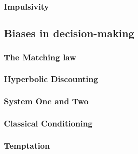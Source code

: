 \subsubsection{Impulsivity}



\subsection{Biases in decision-making}

\subsubsection{The Matching law}


\subsubsection{Hyperbolic Discounting}


\subsubsection{System One and Two}


\subsubsection{Classical Conditioning}


\subsubsection{Temptation}






